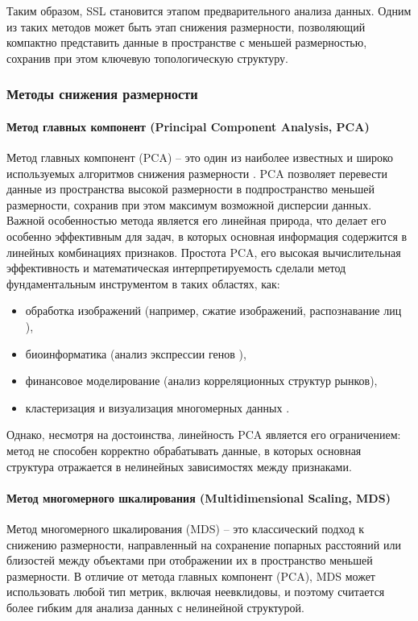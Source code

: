         Таким образом, SSL становится этапом предварительного анализа данных. Одним из таких методов может быть этап снижения размерности, позволяющий компактно представить данные в пространстве с меньшей размерностью, сохранив при этом ключевую топологическую структуру.

    \subsubsection{Методы снижения размерности}

        \paragraph{Метод главных компонент (Principal Component Analysis, PCA)}
            Метод главных компонент (PCA) -- это один из наиболее известных и широко используемых алгоритмов снижения размерности \cite{Jolliffe1986pca}. PCA позволяет перевести данные из пространства высокой размерности в подпространство меньшей размерности, сохранив при этом максимум возможной дисперсии данных. Важной особенностью метода является его линейная природа, что делает его особенно эффективным для задач, в которых основная информация содержится в линейных комбинациях признаков. Простота PCA, его высокая вычислительная эффективность и математическая интерпретируемость сделали метод фундаментальным инструментом в таких областях, как:
            \begin{itemize}
                \item обработка изображений (например, сжатие изображений, распознавание лиц \cite{Turk1991faces}),
                \item биоинформатика (анализ экспрессии генов \cite{Ringner2008pca}),
                \item финансовое моделирование (анализ корреляционных структур рынков),
                \item кластеризация и визуализация многомерных данных \cite{Jolliffe2016PCAbook}.
            \end{itemize}
            Однако, несмотря на достоинства, линейность PCA является его ограничением: метод не способен корректно обрабатывать данные, в которых основная структура отражается в нелинейных зависимостях между признаками.

        \paragraph{Метод многомерного шкалирования (Multidimensional Scaling, MDS)}
            Метод многомерного шкалирования (MDS) -- это классический подход к снижению размерности, направленный на сохранение попарных расстояний или близостей между объектами при отображении их в пространство меньшей размерности. В отличие от метода главных компонент (PCA), MDS может использовать любой тип метрик, включая неевклидовы, и поэтому считается более гибким для анализа данных с нелинейной структурой.

